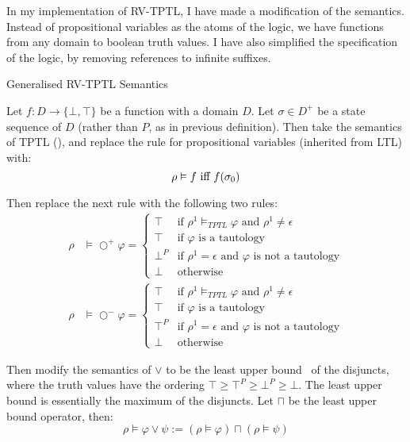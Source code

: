 \documentclass[a4paper]{article}
\newcommand{\tand}{\text{ and }}
\newcommand{\tor}{\text{ or }}
\newcommand{\tiff}{\text{ iff }}
\newcommand{\sn}{\bigcirc^+}
\newcommand{\wn}{\bigcirc^-}
\begin{document}
In my implementation of RV-TPTL, I have made a modification of the semantics. Instead of propositional variables as the atoms of the logic, we have functions from any domain to boolean truth values. I have also simplified the specification of the logic, by removing references to infinite suffixes.

\begin{defn}{Generalised RV-TPTL Semantics}

  Let $f:D\to\{\bot,\top\}$ be a function with a domain $D$. Let $\sigma\in D^+$ be a state sequence of $D$ (rather than $P$, as in previous definition). Then take the semantics of TPTL (), and replace the rule for propositional variables (inherited from LTL) with:
  \[ \rho \vDash f \tiff f(\sigma_0)\\ \]

  Then replace the next rule with the following two rules:
  \begin{align*}
    \rho&\vDash\sn\varphi =
    \begin{cases}
      \top &\text{if } \rho^1\vDash_{TPTL}\varphi \tand \rho^1 \neq \epsilon\\
      \top &\text{if } \varphi \text{ is a tautology}\\
      \bot^P &\text{if } \rho^1 = \epsilon \tand \varphi \text{ is not a tautology}\\
      \bot &\text{otherwise}
    \end{cases}\\
    \rho&\vDash\wn\varphi =
    \begin{cases}
      \top &\text{if } \rho^1\vDash_{TPTL}\varphi \tand \rho^1 \neq \epsilon\\
      \top &\text{if } \varphi \text{ is a tautology}\\
      \top^P &\text{if } \rho^1 = \epsilon \tand \varphi \text{ is not a tautology}\\
      \bot &\text{otherwise}
    \end{cases}
  \end{align*}

  Then modify the semantics of $\lor$ to be the least upper bound~\autocite[654]{bauer2010comparing} of the disjuncts, where the truth values have the ordering \(\top\geq\top^P\geq\bot^P\geq\bot\). The least upper bound is essentially the maximum of the disjuncts. Let $\sqcap$ be the least upper bound operator, then:
  \[\rho\vDash\varphi\lor\psi := (\rho\vDash\varphi) \sqcap (\rho\vDash\psi)\]

\end{defn}
\end{document}
